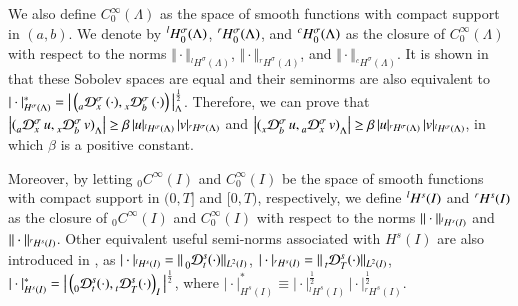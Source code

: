 \noindent We also define $C^{\infty}_{0}(\Lambda)$ as the space of smooth functions with compact support in $(a,b)$. We denote by $\prescript{l}{}H^{\sigma}_0(\Lambda)$, $\prescript{r}{}H^{\sigma}_0(\Lambda)$, and $\prescript{c}{}H^{\sigma}_0(\Lambda)$ as the closure of $C^{\infty}_{0}(\Lambda)$ with respect to the norms $\Vert \cdot \Vert_{{^l}H^{\sigma}_{}(\Lambda)}$, $\Vert \cdot \Vert_{{^r}H^{\sigma}_{}(\Lambda)}$, and $\Vert \cdot \Vert_{{^c}H^{\sigma}_{}(\Lambda)}$. It is shown in \cite{ervin2007variational,Li2010} that these Sobolev spaces are equal and their seminorms are also equivalent to $\vert \cdot \vert_{{}H^{\sigma}_{}(\Lambda)}^{*} = \big\vert \left( \prescript{}{a}{\mathcal{D}}_{x}^{\sigma}\, (\cdot), \prescript{}{x}{\mathcal{D}}_{b}^{\sigma}\, (\cdot) \right) \big\vert_{\Lambda}^{\frac{1}{2}}$. Therefore, we can prove that $\big{\vert}(\prescript{}{a}{\mathcal{D}}_{x}^{\sigma}\, u, \prescript{}{x}{\mathcal{D}}_{b}^{\sigma}\, v )_{\Lambda}^{} \big{\vert} \geq \beta \, \vert u \vert_{{^l}H^{\sigma}_{}(\Lambda)}\, \vert  v \vert_{{^r}H^{\sigma}_{}(\Lambda)}$ and $\big{\vert}(\prescript{}{x}{\mathcal{D}}_{b}^{\sigma}\, u, \prescript{}{a}{\mathcal{D}}_{x}^{\sigma}\, v )_{\Lambda}^{} \big{\vert} \geq \beta \, \vert u \vert_{{^r}H^{\sigma}_{}(\Lambda)}\, \vert  v \vert_{{^l}H^{\sigma}_{}(\Lambda)}$, in which $\beta$ is a positive constant. 



Moreover, by letting ${_0}C^{\infty}(I)$ and $C^{\infty}_{0}(I)$ be the space of smooth functions with compact support in $(0,T]$ and $[0,T)$, respectively, we define $\prescript{l}{}H^{s}(I)$ and $\prescript{r}{}H^{s}(I)$ as the closure of ${_0}C^{\infty}(I)$ and $C^{\infty}_{0}(I)$ with respect to the norms $\Vert \cdot \Vert_{\prescript{l}{}H^{s}(I)}$ and $\Vert \cdot \Vert_{\prescript{r}{}H^{s}(I)}$. Other equivalent useful semi-norms associated with $H^s(I)$ are also introduced in \cite{Li2009,ervin2007variational}, as $\vert \cdot \vert_{{^l}H^{s}(I)} = \Vert \prescript{}{0}{\mathcal{D}}_{t}^{s} (\cdot)\Vert_{L^2(I)}$, $ \vert \cdot \vert_{{^r}H^{s}(I)} = \Vert \prescript{}{t}{\mathcal{D}}_{T}^{s} (\cdot) \Vert_{L^2(I)}$, $\vert \cdot \vert_{{}H^{s}(I)}^* = \big\vert \left( \prescript{}{0}{\mathcal{D}}_{t}^{s}(\cdot),\prescript{}{t}{\mathcal{D}}_{T}^{s}(\cdot) \right)_{I} \big\vert^{\frac{1}{2}}$, where $\vert \cdot \vert_{{}H^{s}(I)}^* \equiv \vert \cdot \vert_{{^l}H^{s}(I)}^{\frac{1}{2}} \, \vert \cdot \vert_{{^r}H^{s}(I)}^{\frac{1}{2}}$. 



